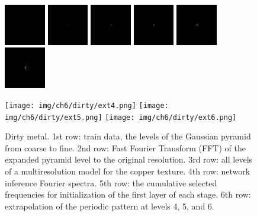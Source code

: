 \begin{figure}[!h]
\includegraphics[width=0.16\textwidth]{img/ch6/dirty/freq1.png}
\includegraphics[width=0.16\textwidth]{img/ch6/dirty/freq2.png}
\includegraphics[width=0.16\textwidth]{img/ch6/dirty/freq3.png}
\includegraphics[width=0.16\textwidth]{img/ch6/dirty/freq4.png}
\includegraphics[width=0.16\textwidth]{img/ch6/dirty/freq5.png}
\includegraphics[width=0.16\textwidth]{img/ch6/dirty/freq6.png}

\texttt{[image: img/ch6/dirty/ext4.png]}
\texttt{[image: img/ch6/dirty/ext5.png]}
\texttt{[image: img/ch6/dirty/ext6.png]}
\caption{Dirty metal. 1st row: train data, the levels of the Gaussian pyramid from coarse to fine. 2nd row: Fast Fourier Transform (FFT) of the expanded pyramid level to the original resolution. 3rd row: all levels of a multiresolution model for the copper texture. 4th row: network inference Fourier spectra. 5th row: the cumulative selected frequencies for initialization of the first layer of each stage. 6th row: extrapolation of the periodic pattern at levels 4, 5, and 6.}
\label{f:dirty-extra}
\end{figure}


